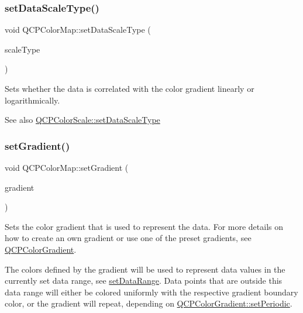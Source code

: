\subsubsection{\texorpdfstring{set\+Data\+Scale\+Type()}{setDataScaleType()}}
{\footnotesize\ttfamily void Q\+C\+P\+Color\+Map\+::set\+Data\+Scale\+Type (\begin{DoxyParamCaption}\item[{\mbox{\hyperlink{class_q_c_p_axis_a36d8e8658dbaa179bf2aeb973db2d6f0}{Q\+C\+P\+Axis\+::\+Scale\+Type}}}]{scale\+Type }\end{DoxyParamCaption})}

Sets whether the data is correlated with the color gradient linearly or logarithmically.

\begin{DoxySeeAlso}{See also}
\mbox{\hyperlink{class_q_c_p_color_scale_aeb6107d67dd7325145b2498abae67fc3}{Q\+C\+P\+Color\+Scale\+::set\+Data\+Scale\+Type}} 
\end{DoxySeeAlso}
\mbox{\label{class_q_c_p_color_map_a7313c78360471cead3576341a2c50377}} 
\subsubsection{\texorpdfstring{set\+Gradient()}{setGradient()}}
{\footnotesize\ttfamily void Q\+C\+P\+Color\+Map\+::set\+Gradient (\begin{DoxyParamCaption}\item[{const \mbox{\hyperlink{class_q_c_p_color_gradient}{Q\+C\+P\+Color\+Gradient}} \&}]{gradient }\end{DoxyParamCaption})}

Sets the color gradient that is used to represent the data. For more details on how to create an own gradient or use one of the preset gradients, see \mbox{\hyperlink{class_q_c_p_color_gradient}{Q\+C\+P\+Color\+Gradient}}.

The colors defined by the gradient will be used to represent data values in the currently set data range, see \mbox{\hyperlink{class_q_c_p_color_map_a980b42837821159786a85b4b7dcb8774}{set\+Data\+Range}}. Data points that are outside this data range will either be colored uniformly with the respective gradient boundary color, or the gradient will repeat, depending on \mbox{\hyperlink{class_q_c_p_color_gradient_a39d6448155fc00a219f239220d14bb39}{Q\+C\+P\+Color\+Gradient\+::set\+Periodic}}.

